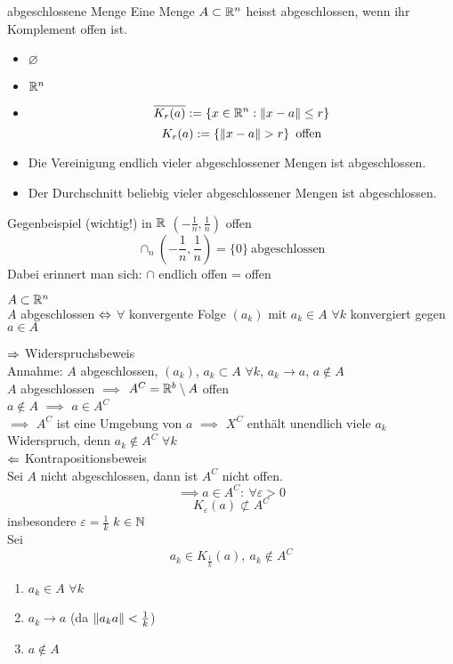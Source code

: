 \begin{Def}{abgeschlossene Menge}
  Eine Menge $A\subset \mathbb{R}^n$ heisst abgeschlossen, wenn ihr Komplement offen ist.
\end{Def}
\begin{Bsp}
  \begin{itemize}
    \item $\varnothing$
    \item $\mathbb{R}^n$
    \item \[\overline{K_r(a)}:=\left\{ x\in\mathbb{R}^n:\left\| x-a \right\|\leq r \right\}\]
      \[K_r(a):=\left\{ \Norm{x-a}>r \right\}\ \text{offen}\]
  \end{itemize}
\end{Bsp}
\begin{Eig}
  \begin{itemize}
    \item Die Vereinigung endlich vieler abgeschlossener Mengen ist abgeschlossen.
    \item Der Durchschnitt beliebig vieler abgeschlossener Mengen ist abgeschlossen.
  \end{itemize}
\end{Eig}
\begin{Bsp}{Gegenbeispiel (wichtig!)}
  in $\mathbb{R}$ $\left( -\frac{1}{n},\frac{1}{n} \right)$ offen
  \[\cap_n\left( -\frac{1}{n},\frac{1}{n} \right)=\{0\}\ \text{abgeschlossen}\]
  Dabei erinnert man sich: $\cap$ endlich offen = offen
\end{Bsp}
\begin{Sat}
  $A\subset\mathbb{R}^n$\\
  $A$ abgeschlossen $\Leftrightarrow$ $\forall$ konvergente Folge $(a_k)$ mit $a_k\in A$ $\forall k$ konvergiert gegen $a\in A$
\end{Sat}
\begin{Bew}
  $\Rightarrow$ Widerspruchsbeweis\\
  Annahme: $A$ abgeschlossen, $(a_k)$, $a_k\subset A$ $\forall k$, $a_k\to a$, $a\not\in A$\\
  $A$ abgeschlossen $\implies$ $A^C=\mathbb{R}^b\setminus A$ offen\\
  $a\not\in A$ $\implies$ $a\in A^C$\\
  $\implies$ $A^C$ ist eine Umgebung von $a$ $\implies$ $X^C$ enthält unendlich viele $a_k$ Widerspruch, denn $a_k\not\in A^C$ $\forall k$\\
  $\Leftarrow$ Kontrapositionsbeweis\\
  Sei $A$ nicht abgeschlossen, dann ist $A^C$ nicht offen.
  \[\implies a\in A^C:\ \forall \varepsilon >0\]
  \[K_\varepsilon(a)\not\subset A^C\]
  insbesondere $\varepsilon=\frac{1}{k}$ $k\in \mathbb{N}$\\
  Sei
  \[a_k\in K_\frac{1}{k}(a),\ a_k\not\in A^C\]
  \begin{enumerate}
    \item $a_k\in A$ $\forall k$
    \item $a_k\to a$ (da $\left\| a_k a \right\|<\frac{1}{k}$)
    \item $a\not\in A$
  \end{enumerate}
\end{Bew}
